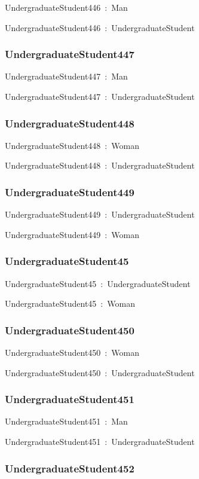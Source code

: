 \documentclass{article}
\begin{document}
UndergraduateStudent446~:~Man

UndergraduateStudent446~:~UndergraduateStudent

\subsubsection*{UndergraduateStudent447}

UndergraduateStudent447~:~Man

UndergraduateStudent447~:~UndergraduateStudent

\subsubsection*{UndergraduateStudent448}

UndergraduateStudent448~:~Woman

UndergraduateStudent448~:~UndergraduateStudent

\subsubsection*{UndergraduateStudent449}

UndergraduateStudent449~:~UndergraduateStudent

UndergraduateStudent449~:~Woman

\subsubsection*{UndergraduateStudent45}

UndergraduateStudent45~:~UndergraduateStudent

UndergraduateStudent45~:~Woman

\subsubsection*{UndergraduateStudent450}

UndergraduateStudent450~:~Woman

UndergraduateStudent450~:~UndergraduateStudent

\subsubsection*{UndergraduateStudent451}

UndergraduateStudent451~:~Man

UndergraduateStudent451~:~UndergraduateStudent

\subsubsection*{UndergraduateStudent452}
\end{document}
